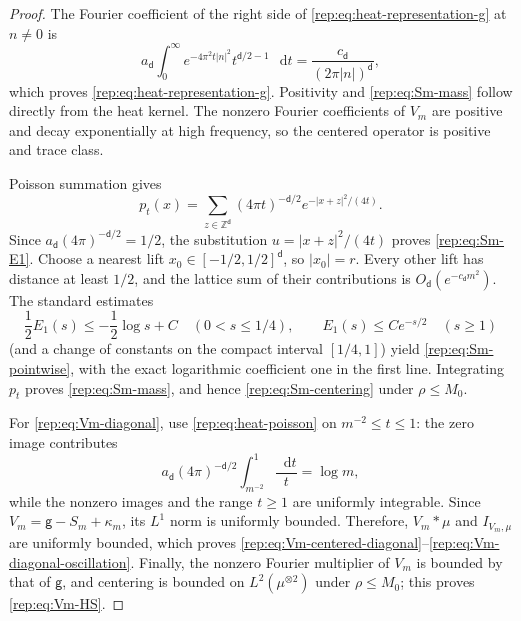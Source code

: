 \documentclass[11pt,reqno]{amsart}
\numberwithin{equation}{section}
\theoremstyle{plain}
\theoremstyle{definition}
\renewcommand{\d}{\mathsf d}
\newcommand{\dd}{\mathop{}\!\mathrm d}
\newcommand{\Z}{\mathbb Z}
\newcommand{\g}{\mathsf g}
\begin{document}
\begin{proof}
The Fourier coefficient of the right side of \eqref{rep:eq:heat-representation-g} at $n\ne0$ is
\begin{equation}\label{rep:eq:heat-fourier-check}
 a_{\d}\int_0^\infty e^{-4\pi^2t|n|^2}t^{\d/2-1}\,\dd t
 =\frac{c_{\d}}{(2\pi|n|)^{\d}},
\end{equation}
which proves \eqref{rep:eq:heat-representation-g}.  Positivity and \eqref{rep:eq:Sm-mass} follow directly from the heat kernel.  The nonzero Fourier coefficients of $V_m$ are positive and decay exponentially at high frequency, so the centered operator is positive and trace class.

Poisson summation gives
\begin{equation}\label{rep:eq:heat-poisson}
 p_t(x)=\sum_{z\in\Z^{\d}}(4\pi t)^{-\d/2}
 e^{-|x+z|^2/(4t)}.
\end{equation}
Since $a_{\d}(4\pi)^{-\d/2}=1/2$, the substitution $u=|x+z|^2/(4t)$ proves \eqref{rep:eq:Sm-E1}.  Choose a nearest lift $x_0\in[-1/2,1/2]^{\d}$, so $|x_0|=r$.  Every other lift has distance at least $1/2$, and the lattice sum of their contributions is $O_{\d}(e^{-c_{\d}m^2})$.  The standard estimates
\begin{equation}\label{rep:eq:E1-estimates}
 \frac12E_1(s)\le-\frac12\log s+C\quad(0<s\le1/4),
 \qquad
 E_1(s)\le Ce^{-s/2}\quad(s\ge1)
\end{equation}
(and a change of constants on the compact interval $[1/4,1]$) yield \eqref{rep:eq:Sm-pointwise}, with the exact logarithmic coefficient one in the first line.  Integrating $p_t$ proves \eqref{rep:eq:Sm-mass}, and hence \eqref{rep:eq:Sm-centering} under $\rho\le M_0$.

For \eqref{rep:eq:Vm-diagonal}, use \eqref{rep:eq:heat-poisson} on $m^{-2}\le t\le1$: the zero image contributes
\begin{equation}\label{rep:eq:Vm-log}
 a_{\d}(4\pi)^{-\d/2}\int_{m^{-2}}^1\frac{\dd t}{t}
 =\log m,
\end{equation}
while the nonzero images and the range $t\ge1$ are uniformly integrable.  Since $V_m=\g-S_m+\kappa_m$, its $L^1$ norm is uniformly bounded.  Therefore, $V_m*\mu$ and $I_{V_m,\mu}$ are uniformly bounded, which proves \eqref{rep:eq:Vm-centered-diagonal}--\eqref{rep:eq:Vm-diagonal-oscillation}.  Finally, the nonzero Fourier multiplier of $V_m$ is bounded by that of $\g$, and centering is bounded on $L^2(\mu^{\otimes2})$ under $\rho\le M_0$; this proves \eqref{rep:eq:Vm-HS}.
\end{proof}
\end{document}
